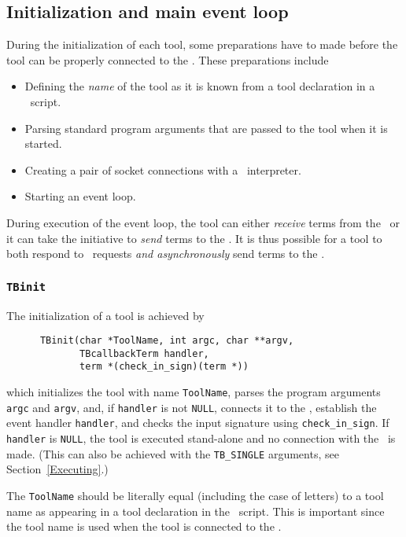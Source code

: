 \documentclass[a4,twoside,noweb]{article} %
\begin{document}
\subsection{\label{Init}Initialization and main event loop}

During the initialization of each tool, some preparations have to made
before the tool can be properly connected to the \TB. These preparations
include
\begin{itemize}
\item Defining the {\em name} of the tool as it is known from a tool declaration
in a \T\ script.
\item Parsing standard program arguments that are passed to the tool
when it is started.
\item Creating a pair of socket connections with a \TB\ interpreter.
\item Starting an event loop.
\end{itemize}

During execution of the event loop, the tool can either {\em receive} terms from
the \TB\ or it can take the initiative to {\em send} terms to the \TB.
It is thus possible for a tool to both respond to \TB\ requests
{\em and asynchronously} send terms to the \TB.

\subsubsection{\label{TBinit}{\tt TBinit}}

The initialization of a tool is achieved by
\begin{verbatim}
      TBinit(char *ToolName, int argc, char **argv,
             TBcallbackTerm handler,
             term *(check_in_sign)(term *))
\end{verbatim}
which initializes the tool with name {\tt ToolName},
parses the program arguments {\tt argc} and {\tt argv},
and, if {\tt handler} is not {\tt NULL},
connects it to the \TB, establish the event handler {\tt handler},
and checks the input signature using {\tt check\_in\_sign}.
If {\tt handler} is {\tt NULL}, the tool is executed stand-alone
and no connection with the \TB\ is made.
(This can also be achieved with the {\tt TB\_SINGLE} arguments,
see Section~\ref{Executing}.)

The {\tt ToolName} should be literally equal (including the case of letters)
to a tool name as appearing in
a tool declaration in the \T\ script. This is important since the tool name
is used when the tool is connected to the \TB.
\end{document}

